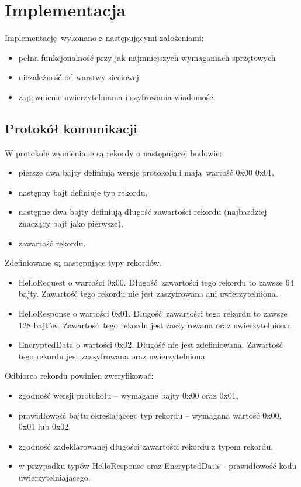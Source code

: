 \chapter{Implementacja}
\label{cha:implementacja}

Implementację wykonano z następującymi założeniami:

\begin{itemize}
\item pełna funkcjonalność przy jak najmniejszych wymaganiach sprzętowych
\item niezależność od warstwy sieciowej
\item zapewnienie uwierzytelniania i szyfrowania wiadomości
\end{itemize}

\section{Protokół komunikacji}
\label{sec:proto}

W protokole wymieniane są rekordy o następującej budowie:

\begin{itemize}
\item piersze dwa bajty definiują wersję protokołu i mają wartość 0x00 0x01,
\item następny bajt definiuje typ rekordu,
\item następne dwa bajty definiują długość zawartości rekordu (najbardziej znaczący bajt jako pierwsze),
\item zawartość rekordu.
\end{itemize}

Zdefiniowane są następujące typy rekordów.

\begin{itemize}
\item HelloRequest o wartości 0x00. Długość zawartości tego rekordu to zawsze 64 bajty. Zawartość tego rekordu nie jest zaszyfrowana ani uwierzytelniona.
\item HelloResponse o wartości 0x01. Długość zawartości tego rekordu to zawsze 128 bajtów. Zawartość tego rekordu jest zaszyfrowana oraz uwierzytelniona.
\item EncryptedData o wartości 0x02. Długość nie jest zdefiniowana. Zawartość tego rekordu jest zaszyfrowana oraz uwierzytelniona
\end{itemize}

Odbiorca rekordu powinien zweryfikować:

\begin{itemize}
\item zgodność wersji protokołu -- wymagane bajty 0x00 oraz 0x01,
\item prawidłowość bajtu określającego typ rekordu -- wymagana wartość 0x00, 0x01 lub 0x02,
\item zgodność zadeklarowanej długości zawartości rekordu z typem rekordu,
\item w przypadku typów HelloResponse oraz EncryptedData -- prawidłowość kodu uwierzytelniającego.
\end{itemize}

